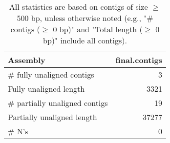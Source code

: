 \documentclass[12pt,a4paper]{article}
\begin{document}
\begin{table}[ht]
\begin{center}
\caption{All statistics are based on contigs of size $\geq$ 500 bp, unless otherwise noted (e.g., "\# contigs ($\geq$ 0 bp)" and "Total length ($\geq$ 0 bp)" include all contigs).}
\begin{tabular}{|l*{1}{|r}|}
\hline
Assembly & final.contigs \\ \hline
\# fully unaligned contigs & 3 \\ \hline
Fully unaligned length & 3321 \\ \hline
\# partially unaligned contigs & 19 \\ \hline
Partially unaligned length & 37277 \\ \hline
\# N's & 0 \\ \hline
\end{tabular}
\end{center}
\end{table}
\end{document}

